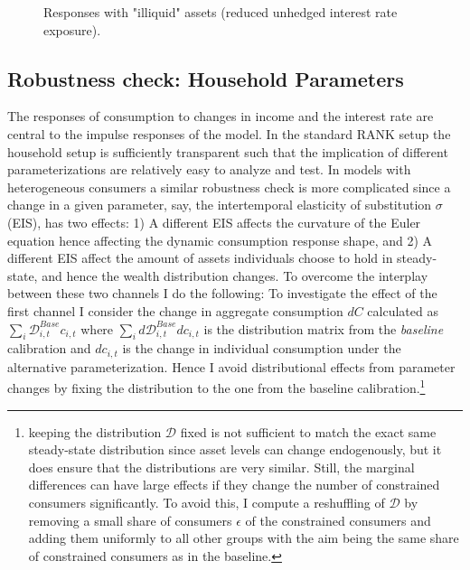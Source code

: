 \begin{figure}[H]
     \caption{Responses with "illiquid" assets (reduced unhedged interest rate exposure).}
\label{fig:dC_dR_illiquid_example}
\end{figure}



\subsection{Robustness check: Household Parameters} \label{sec:C_robustness}
The responses of consumption to changes in income and the interest rate are central to the impulse responses of the model. In the standard RANK setup the household setup is sufficiently transparent such that the implication of different parameterizations are relatively easy to analyze and test. In models with heterogeneous consumers a similar robustness check is more complicated since a change in a given parameter, say, the intertemporal elasticity of substitution $\sigma$ (EIS), has two effects: 1) A different EIS affects the curvature of the Euler equation hence affecting the dynamic consumption response shape, and 2) A different EIS affect the amount of assets individuals choose to hold in steady-state, and hence the wealth distribution changes. To overcome the interplay between these two channels I do the following: To investigate the effect of the first channel I consider the change in aggregate consumption $dC$ calculated as $\sum_{i}\mathcal{D}_{i,t}^{Base}c_{i,t}$ where $\sum_{i}d\mathcal{D}_{i,t}^{Base}dc_{i,t}$ is the distribution matrix from the \textit{baseline} calibration and $dc_{i,t}$ is the change in individual consumption under the alternative parameterization. Hence I avoid distributional effects from parameter changes by fixing the distribution to the one from the baseline calibration.\footnote{keeping the distribution $\mathcal{D}$ fixed is not sufficient to match the exact same steady-state distribution since asset levels can change endogenously, but it does ensure that the distributions are very similar. Still, the marginal differences can have large effects if they change the number of constrained consumers significantly. To avoid this, I compute a reshuffling of $\mathcal{D}$ by removing a small share of consumers $\epsilon$ of the constrained consumers and adding them uniformly to all other groups with the aim being the same share of constrained consumers as in the baseline.  } \\


